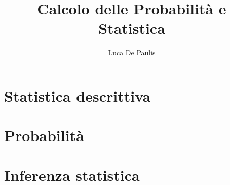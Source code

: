 \documentclass[
    oneside,
    10pt,
    language=italian,
    pagestyle=notes,
    fontstyle=palaeuler,
    thmstyle=margin-name
]{modernth}
\begin{document}
\author{Luca De Paulis}
\title{Calcolo delle Probabilità e Statistica}
\maketitle

\frontmatter{}
\tableofcontents

\mainmatter{}
\chapter{Statistica descrittiva}


\chapter{Probabilità}









\chapter{Inferenza statistica}




\appendix

\end{document}

